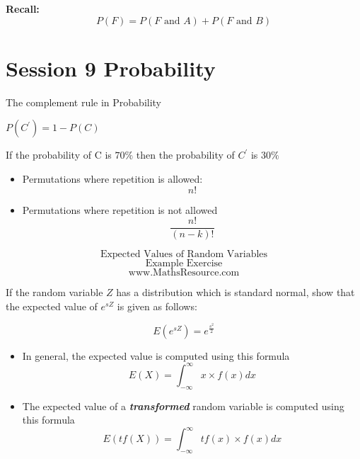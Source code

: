 \documentclass[12pt]{report}
\begin{document}
		\textbf{Recall:}
		\[ P(F) = P(F \mbox{ and } A) + P(F \mbox{ and } B) \]
		
		
		
		\newpage
		\section*{Session 9 Probability}

		
		
		The complement rule in Probability
		
		$P(C^{\prime}) = 1- P(C)$
		
		
		
		If the probability of C is $70 \%$ then the probability of $C^{\prime}$ is $30\%$
		
		
		\newpage


\large
\begin{itemize}
	\item Permutations where repetition is allowed: 
	\[ n! \]
	\item Permutations where repetition is not allowed
	\[ \frac{n!}{(n-k)!} \]
	\end{itemize}
	
	
	
	
	
	
	\bigskip
	{
		\huge
		\[ \mbox{Expected Values of Random Variables}\]
		\Large
		\[ \mbox{Example Exercise}\]
		\bigskip
		\Large
		\[ \mbox{www.MathsResource.com}\]
	}
	
	
	
	\Large
	If the random variable $Z$ has a distribution which is standard normal, show that the expected value of $e^{sZ}$ is given as follows:
	
	{
		\LARGE
		\[E(e^{sZ})  =  e^{\frac{s^2}{2}}\] 
	}
	
	
	
	
	
	\Large
	\begin{itemize}
		\item In general, the expected value is computed using this formula
		{
			\LARGE
			\[ E(X) =  \int_{-\infty}^{\infty}  x \times f(x) dx   \]
		}
		\item The expected value of a \textbf{\textit{transformed}} random variable is computed using this formula
		{
			\LARGE
			\[ E( tf(X) ) =  \int_{-\infty}^{\infty}  tf(x) \times f(x) dx   \]
		}
	\end{itemize}
	
\end{document}
